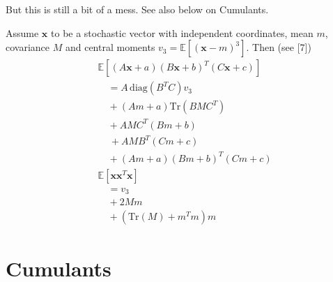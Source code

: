 But this is still a bit of a mess.
See also below on Cumulants.



Assume \(\mathbf{x}\) to be a stochastic vector with independent coordinates, mean \(m\),
covariance \(M\) and central moments \(v_3 = \mathbb{E}[(\mathbf{x} - m)^3]\). Then (see [7])
\begin{align*}
&\mathbb{E}[(A\mathbf{x} + a)(B\mathbf{x} + b)^T (C\mathbf{x} + c)]
\\&\quad=
A\,\mathrm{diag}(B^T C) v_3
\\&\quad+
(Am + a) \mathrm{Tr}(BMC^T)
\\&\quad+
AMC^T (Bm + b)
\\&\quad\,+
AMB^T (Cm + c)
\\&\quad+
(Am + a)(Bm + b)^T (Cm + c)
\\
  &\mathbb{E}[\mathbf{x} \mathbf{x}^T \mathbf{x}]
\\&\quad=
   v_3
\\&\quad+
   2 Mm
\\&\quad+
   (\text{Tr}(M) + m^T m) m
\end{align*}


\section{Cumulants}

